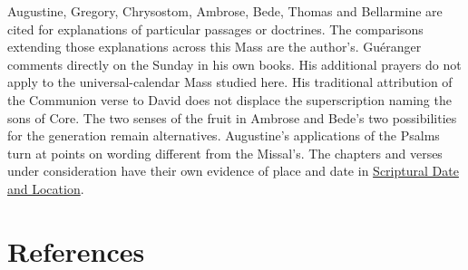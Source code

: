 Augustine, Gregory, Chrysostom, Ambrose, Bede, Thomas and Bellarmine are cited for explanations of particular passages or doctrines. The comparisons extending those explanations across this Mass are the author's. Guéranger comments directly on the Sunday in his own books. His additional prayers do not apply to the universal-calendar Mass studied here. His traditional attribution of the Communion verse to David does not displace the superscription naming the sons of Core. The two senses of the fruit in Ambrose and Bede's two possibilities for the generation remain alternatives. Augustine's applications of the Psalms turn at points on wording different from the Missal's. The chapters and verses under consideration have their own evidence of place and date in \hyperref[sec:date-location]{Scriptural Date and Location}.

\section{References}


